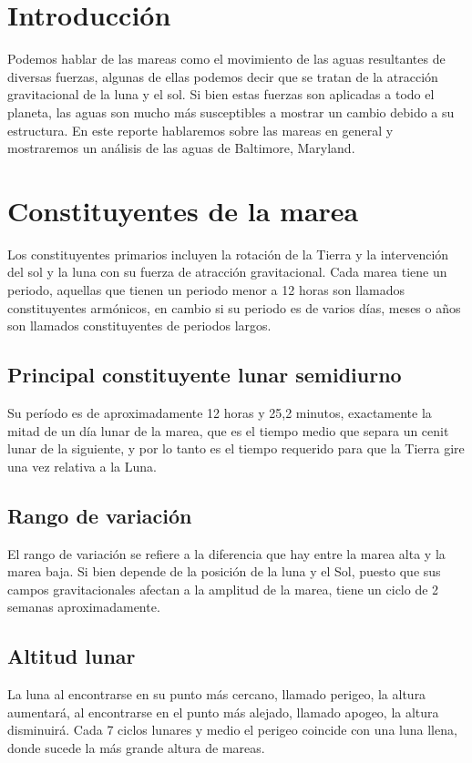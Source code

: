 \documentclass[a4paper,12pt]{article}
\begin{document}
\section{Introducción}
\noindent
Podemos hablar de las mareas como el movimiento de las aguas resultantes de diversas fuerzas, algunas de ellas podemos decir que se tratan de la atracción gravitacional de la luna y el sol. Si bien estas fuerzas son aplicadas a todo el planeta, las aguas son mucho más susceptibles a mostrar un cambio debido a su estructura. En este reporte hablaremos sobre las mareas en general y mostraremos un análisis de las aguas de Baltimore, Maryland.
\section{Constituyentes de la marea}
\noindent
Los constituyentes primarios incluyen la rotación de la Tierra y la intervención del sol y la luna con su fuerza de atracción gravitacional. Cada marea tiene un periodo, aquellas que tienen un periodo menor a 12 horas son llamados constituyentes armónicos, en cambio si su periodo es de varios días, meses o años son llamados constituyentes de periodos largos. 
\subsection{Principal constituyente lunar semidiurno}
\noindent
Su período es de aproximadamente 12 horas y 25,2 minutos, exactamente la mitad de un día lunar de la marea, que es el tiempo medio que separa un cenit lunar de la siguiente, y por lo tanto es el tiempo requerido para que la Tierra gire una vez relativa a la Luna.

\subsection{Rango de variación} 
\noindent
El rango de variación se refiere a la diferencia que hay entre la marea alta y la marea baja. Si bien depende de la posición de la luna y el Sol, puesto que sus campos gravitacionales afectan a la amplitud de la marea, tiene un ciclo de 2 semanas aproximadamente.

\subsection{Altitud lunar} 
\noindent
La luna al encontrarse en su punto más cercano, llamado perigeo, la altura aumentará, al encontrarse en el punto más alejado, llamado apogeo, la altura disminuirá. Cada 7 ciclos lunares y medio el perigeo coincide con una luna llena, donde sucede la más grande altura de mareas.
\end{document}
